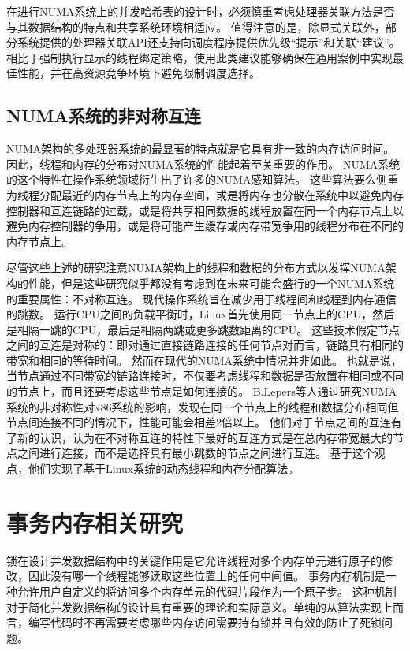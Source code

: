 在进行NUMA系统上的并发哈希表的设计时，必须慎重考虑处理器关联方法是否与其数据结构的特点和共享系统环境相适应。 
值得注意的是，除显式关联外，部分系统提供的处理器关联API还支持向调度程序提供优先级“提示”和关联“建议”。 相比于强制执行显示的线程绑定策略，使用此类建议能够确保在通用案例中实现最佳性能，并在高资源竞争环境下避免限制调度选择。

\subsection{NUMA系统的非对称互连}
\label{sec:}
NUMA架构的多处理器系统的最显著的特点就是它具有非一致的内存访问时间。
因此，线程和内存的分布对NUMA系统的性能起着至关重要的作用。
NUMA系统的这个特性在操作系统领域衍生出了许多的NUMA感知算法。
这些算法要么侧重为线程分配最近的内存节点上的内存空间\cite{brecht1993importance,lachaize2012memprof,dashti2013traffic}，或是将内存也分散在系统中以避免内存控制器和互连链路的过载\cite{dashti2013traffic}，或是将共享相同数据的线程放置在同一个内存节点上\cite{tam2007thread,tang2013optimizing}以避免内存控制器的争用\cite{bull2002data,blagodurov2010case,tang2013optimizing}，或是将可能产生缓存或内存带宽争用的线程分布在不同的内存节点上。

尽管这些上述的研究注意NUMA架构上的线程和数据的分布方式以发挥NUMA架构的性能，但是这些研究似乎都没有考虑到在未来可能会盛行的一个NUMA系统的重要属性：不对称互连。
现代操作系统旨在减少用于线程间和线程到内存通信的跳数。
运行CPU之间的负载平衡时，Linux首先使用同一节点上的CPU，然后是相隔一跳的CPU，最后是相隔两跳或更多跳数距离的CPU。
这些技术假定节点之间的互连是对称的：即对通过直接链路连接的任何节点对而言，链路具有相同的带宽和相同的等待时间。
然而在现代的NUMA系统中情况并非如此。
也就是说，当节点通过不同带宽的链路连接时，不仅要考虑线程和数据是否放置在相同或不同的节点上，而且还要考虑这些节点是如何连接的。
B.Lepers\cite{lepers2015thread}等人通过研究NUMA系统的非对称性对x86系统的影响，发现在同一个节点上的线程和数据分布相同但节点间连接不同的情况下，性能可能会相差2倍以上。
他们对于节点之间的互连有了新的认识，认为在不对称互连的特性下最好的互连方式是在总内存带宽最大的节点之间进行连接，而不是选择具有最小跳数的节点之间进行互连。
基于这个观点，他们实现了基于Linux系统的动态线程和内存分配算法\cite{lepers2015thread}。


\section{事务内存相关研究}
锁在设计并发数据结构中的关键作用是它允许线程对多个内存单元进行原子的修改，因此没有哪一个线程能够读取这些位置上的任何中间值。
事务内存机制是一种允许用户自定义的将访问多个内存单元的代码片段作为一个原子步\cite{moir2004concurrent}。
这种机制对于简化并发数据结构的设计具有重要的理论和实际意义。单纯的从算法实现上而言，编写代码时不再需要考虑哪些内存访问需要持有锁并且有效的防止了死锁问题。

